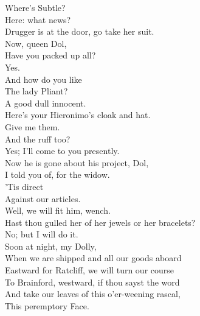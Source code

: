 \documentclass[a4paper,oneside,12pt]{memoir}
\begin{document}
\begin{drama*}
\facespeaks {} Where's Subtle?\\
\subtlespeaks {} Here: what news?\\
\facespeaks Drugger is at the door, go take her suit.\\
 Now, queen Dol,\\
Have you packed up all?\\
\dolspeaks {} Yes.\\
\facespeaks {} And how do you like\\
The lady Pliant?\\
\dolspeaks {} A good dull innocent.\\
\subtlespeaks Here's your Hieronimo's cloak and hat.\\
\facespeaks {} Give me them.\\
\subtlespeaks And the ruff too?\\
\facespeaks {} Yes; I'll come to you presently.\\
\subtlespeaks Now he is gone about his project, Dol,\\
I told you of, for the widow.\\
\dolspeaks {} 'Tis direct\\
Against our articles.\\
\subtlespeaks {} Well, we will fit him, wench.\\
Hast thou gulled her of her jewels or her bracelets?\\
\dolspeaks No; but I will do it.\\
\subtlespeaks {} Soon at night, my Dolly,\\
When we are shipped and all our goods aboard\\
Eastward for Ratcliff, we will turn our course\\
To Brainford, westward, if thou sayst the word\\
And take our leaves of this o'er-weening rascal,\\
This peremptory Face.\\

\end{drama*}
\end{document}
